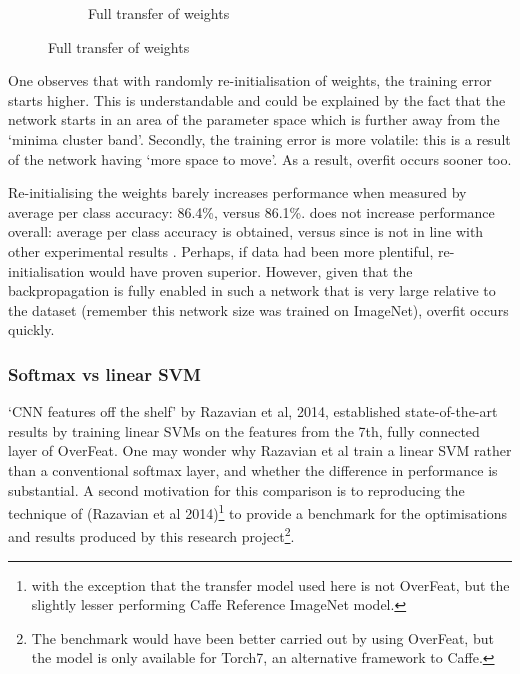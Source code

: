 \documentclass[a4paper,11pt]{article}
\begin{document}
\begin{figure}
\begin{minipage}[b]{\textwidth}
\begin{subfigure}{.5\textwidth}
        \caption{Full transfer of weights}\label{fig:2b}
      \end{subfigure} \par \vspace*{20pt} %
    \end{minipage}%
\end{figure}

One observes that with randomly re-initialisation of weights, the training error starts higher. This is understandable and could be explained by the fact that the network starts in an area of the parameter space which is further away from the `minima cluster band'. Secondly, the training error is more volatile: this is a result of the network having `more space to move'. As a result, overfit occurs sooner too. 

Re-initialising the weights barely increases performance when measured by average per class accuracy: 86.4\%, versus 86.1\%. does not increase performance overall:  average per class accuracy is obtained, versus since is not in line with other experimental results \cite{transfer-learning}. Perhaps, if data had been more plentiful, re-initialisation would have proven superior. However, given that the backpropagation is fully enabled in such a network that is very large relative to the dataset (remember this network size was trained on ImageNet), overfit occurs quickly.


\subsubsection{Softmax vs linear SVM}

`CNN features off the shelf' by Razavian et al, 2014, \cite{off-the-shelf} established state-of-the-art results by training linear SVMs on the features from the 7th, fully connected layer of OverFeat. One may wonder why Razavian et al train a linear SVM rather than a conventional softmax layer, and whether the difference in performance is substantial. A second motivation for this comparison is to reproducing the technique of (Razavian et al 2014)\footnote{with the exception that the transfer model used here is not OverFeat, but the slightly lesser performing Caffe Reference ImageNet model.} to provide a benchmark for the optimisations and results produced by this research project\footnote{The benchmark would have been better carried out by using OverFeat, but the model is only available for Torch7, an alternative framework to Caffe.}.
\end{document}
